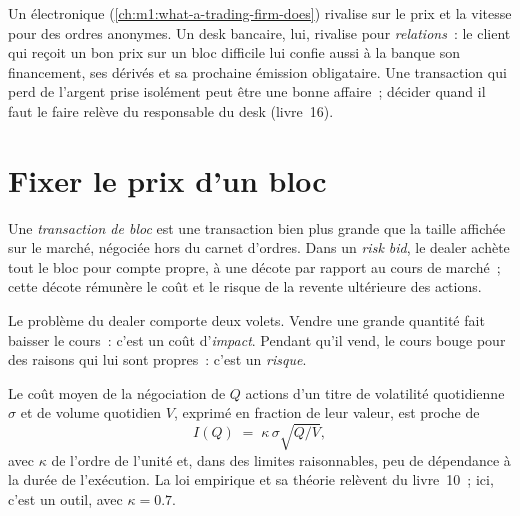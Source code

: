 \begin{remark}\label{rem:m1:the-sell-side:notprop}
Un  électronique (\cref{ch:m1:what-a-trading-firm-does}) rivalise
sur le prix et la vitesse pour des ordres anonymes. Un desk bancaire, lui, rivalise pour
\emph{relations}~: le client qui reçoit un bon prix sur un bloc difficile
lui confie aussi à la banque son financement, ses dérivés et sa prochaine
émission obligataire. Une transaction qui perd de l'argent prise isolément peut être une bonne affaire~; décider
quand il faut le faire relève du responsable du desk (livre~16).
\end{remark}

\section{Fixer le prix d'un bloc}

\begin{definition}\label{def:m1:the-sell-side:block}
Une \emph{transaction de bloc} est une transaction bien plus grande que la
taille affichée sur le marché, négociée hors du carnet d'ordres. Dans un
\emph{risk bid}, le dealer achète tout le bloc pour compte propre, à une décote
par rapport au cours de marché~; cette décote rémunère le coût et le risque de
la revente ultérieure des actions.
\end{definition}

Le problème du dealer comporte deux volets. Vendre une grande quantité fait baisser le
cours~: c'est un coût d'\emph{impact}. Pendant qu'il vend, le cours bouge pour des
raisons qui lui sont propres~: c'est un \emph{risque}.

\begin{method}\label{met:m1:the-sell-side:sqrt}
Le coût moyen de la négociation de $Q$ actions d'un titre de volatilité
quotidienne $\sigma$ et de volume quotidien $V$, exprimé en fraction de leur valeur, est proche de
\[
  I(Q) \;=\; \kappa\,\sigma\sqrt{Q/V},
\]
avec $\kappa$ de l'ordre de l'unité et, dans des limites raisonnables, peu de dépendance
à la durée de l'exécution. La loi empirique et sa théorie relèvent du
livre~10~; ici, c'est un outil, avec $\kappa = 0.7$.
\end{method}

